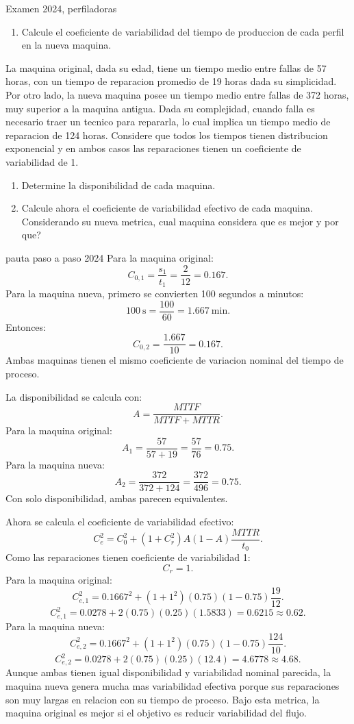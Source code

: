 \begin{enunciado}{Examen 2024, perfiladoras}
\begin{enumerate}[label=\alph*),resume]
  \item Calcule el coeficiente de variabilidad del tiempo de produccion de cada perfil en la nueva maquina.
\end{enumerate}

La maquina original, dada su edad, tiene un tiempo medio entre fallas de 57 horas, con un tiempo de reparacion promedio de 19 horas dada su simplicidad. Por otro lado, la nueva maquina posee un tiempo medio entre fallas de 372 horas, muy superior a la maquina antigua. Dada su complejidad, cuando falla es necesario traer un tecnico para repararla, lo cual implica un tiempo medio de reparacion de 124 horas. Considere que todos los tiempos tienen distribucion exponencial y en ambos casos las reparaciones tienen un coeficiente de variabilidad de 1.

\begin{enumerate}[label=\alph*),resume]
  \item Determine la disponibilidad de cada maquina.
  \item Calcule ahora el coeficiente de variabilidad efectivo de cada maquina. Considerando su nueva metrica, cual maquina considera que es mejor y por que?
\end{enumerate}
\end{enunciado}

\begin{pautacompleta}{pauta paso a paso 2024}
Para la maquina original:
\[
  C_{0,1}=\frac{s_1}{t_1}=\frac{2}{12}=0.167.
\]
Para la maquina nueva, primero se convierten 100 segundos a minutos:
\[
  100\ \text{s}=\frac{100}{60}=1.667\ \text{min}.
\]
Entonces:
\[
  C_{0,2}=\frac{1.667}{10}=0.167.
\]
Ambas maquinas tienen el mismo coeficiente de variacion nominal del tiempo de proceso.

La disponibilidad se calcula con:
\[
  A=\frac{MTTF}{MTTF+MTTR}.
\]
Para la maquina original:
\[
  A_1=\frac{57}{57+19}=\frac{57}{76}=0.75.
\]
Para la maquina nueva:
\[
  A_2=\frac{372}{372+124}=\frac{372}{496}=0.75.
\]
Con solo disponibilidad, ambas parecen equivalentes.

Ahora se calcula el coeficiente de variabilidad efectivo:
\[
  C_e^2=C_0^2+(1+C_r^2)A(1-A)\frac{MTTR}{t_0}.
\]
Como las reparaciones tienen coeficiente de variabilidad 1:
\[
  C_r=1.
\]
Para la maquina original:
\[
  C_{e,1}^2=0.1667^2+(1+1^2)(0.75)(1-0.75)\frac{19}{12}.
\]
\[
  C_{e,1}^2=0.0278+2(0.75)(0.25)(1.5833)=0.6215\approx 0.62.
\]
Para la maquina nueva:
\[
  C_{e,2}^2=0.1667^2+(1+1^2)(0.75)(1-0.75)\frac{124}{10}.
\]
\[
  C_{e,2}^2=0.0278+2(0.75)(0.25)(12.4)=4.6778\approx 4.68.
\]
Aunque ambas tienen igual disponibilidad y variabilidad nominal parecida, la maquina nueva genera mucha mas variabilidad efectiva porque sus reparaciones son muy largas en relacion con su tiempo de proceso. Bajo esta metrica, la maquina original es mejor si el objetivo es reducir variabilidad del flujo.
\end{pautacompleta}
